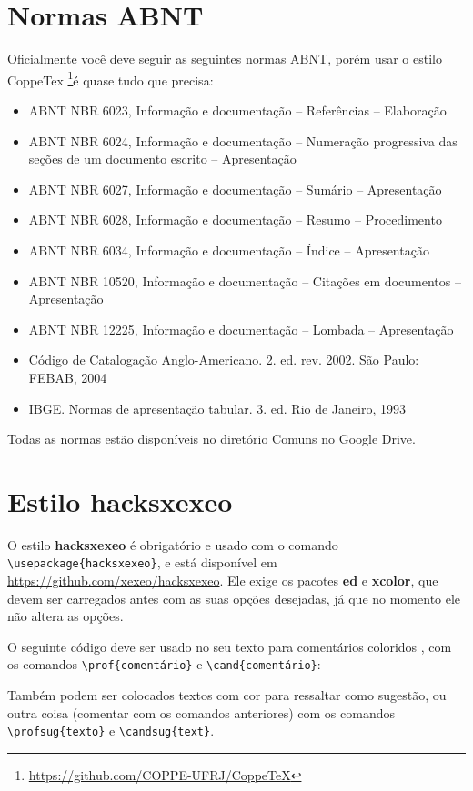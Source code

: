 \documentclass{article}
\begin{document}
\section{Normas ABNT}

Oficialmente você deve seguir as seguintes normas ABNT, porém usar o estilo CoppeTex \footnote{\url{https://github.com/COPPE-UFRJ/CoppeTeX}}é quase tudo que precisa:
\begin{itemize}
    \item ABNT NBR 6023, Informação e documentação – Referências – Elaboração
\item ABNT NBR 6024, Informação e documentação – Numeração progressiva das seções de um documento
escrito – Apresentação
\item ABNT NBR 6027, Informação e documentação – Sumário – Apresentação
\item ABNT NBR 6028, Informação e documentação – Resumo – Procedimento
\item ABNT NBR 6034, Informação e documentação – Índice – Apresentação
\item ABNT NBR 10520, Informação e documentação – Citações em documentos – Apresentação
\item ABNT NBR 12225, Informação e documentação – Lombada – Apresentação
\item Código de Catalogação Anglo-Americano. 2. ed. rev. 2002. São Paulo: FEBAB, 2004
\item IBGE. Normas de apresentação tabular. 3. ed. Rio de Janeiro, 1993
\end{itemize}

Todas as normas estão disponíveis no diretório Comuns no Google Drive.

\section{Estilo hacksxexeo}

O estilo \textbf{hacksxexeo} é obrigatório e usado com o comando \verb!\usepackage{hacksxexeo}!, e está disponível em \url{https://github.com/xexeo/hacksxexeo}. Ele exige os pacotes \textbf{ed} e \textbf{xcolor}, que devem ser carregados antes com as suas opções desejadas, já que no momento ele não altera as opções.

O seguinte código deve ser usado no seu texto para comentários coloridos , com os comandos \verb!\prof{comentário}! e \verb!\cand{comentário}!:

Também podem ser colocados textos com cor para ressaltar como sugestão, ou outra coisa (comentar com os comandos anteriores) com os comandos \verb!\profsug{texto}! e
\verb!\candsug{text}!.
\end{document}
